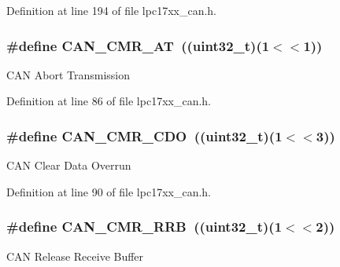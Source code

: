 \-Definition at line 194 of file lpc17xx\-\_\-can.\-h.

\hypertarget{group___c_a_n___private___macros_ga2c62ebf606fecb5f3a891642f5bc25d6}{
\subsubsection[{\-C\-A\-N\-\_\-\-C\-M\-R\-\_\-\-A\-T}]{\setlength{\rightskip}{0pt plus 5cm}\#define {\bf \-C\-A\-N\-\_\-\-C\-M\-R\-\_\-\-A\-T}~((uint32\-\_\-t)(1$<$$<$1))}}\label{group___c_a_n___private___macros_ga2c62ebf606fecb5f3a891642f5bc25d6}
\-C\-A\-N \-Abort \-Transmission 

\-Definition at line 86 of file lpc17xx\-\_\-can.\-h.

\hypertarget{group___c_a_n___private___macros_ga867ee74878ca3d86ec6d0cd2e25e15ac}{
\subsubsection[{\-C\-A\-N\-\_\-\-C\-M\-R\-\_\-\-C\-D\-O}]{\setlength{\rightskip}{0pt plus 5cm}\#define {\bf \-C\-A\-N\-\_\-\-C\-M\-R\-\_\-\-C\-D\-O}~((uint32\-\_\-t)(1$<$$<$3))}}\label{group___c_a_n___private___macros_ga867ee74878ca3d86ec6d0cd2e25e15ac}
\-C\-A\-N \-Clear \-Data \-Overrun 

\-Definition at line 90 of file lpc17xx\-\_\-can.\-h.

\hypertarget{group___c_a_n___private___macros_gaca5b99941b4a44bf4fc0233cd740db2c}{
\subsubsection[{\-C\-A\-N\-\_\-\-C\-M\-R\-\_\-\-R\-R\-B}]{\setlength{\rightskip}{0pt plus 5cm}\#define {\bf \-C\-A\-N\-\_\-\-C\-M\-R\-\_\-\-R\-R\-B}~((uint32\-\_\-t)(1$<$$<$2))}}\label{group___c_a_n___private___macros_gaca5b99941b4a44bf4fc0233cd740db2c}
\-C\-A\-N \-Release \-Receive \-Buffer 

